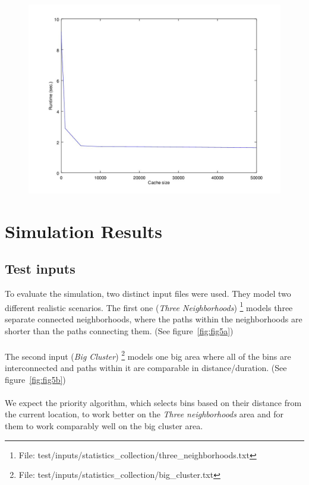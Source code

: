 \documentclass{article}
\begin{document}
			\begin{figure}[H]
			\centering
				\includegraphics[width=.55\columnwidth]{resources/cache_size.jpg}
				\label{fig:fig4}
			\end{figure}
			

	\section{Simulation Results} \label{stats}

		\subsection{Test inputs}
			To evaluate the simulation, two distinct input files were used. They model two different realistic scenarios.
			The first one (\textit{Three Neighborhoods}) \footnote{File: test/inputs/statistics\_collection/three\_neighborhoods.txt} models three separate connected neighborhoods, where the paths
			within the neighborhoods are shorter than the paths connecting them. (See figure~\ref{fig:fig5a}) 
			\\
			\\
			The second input (\textit{Big Cluster}) \footnote{File: test/inputs/statistics\_collection/big\_cluster.txt} models one big area where all of the bins are interconnected and paths
			within it are comparable in distance/duration. (See figure~\ref{fig:fig5b})
			\\
			\\
			We expect the priority algorithm, which selects bins based on their distance from the current location, to work
			better on the \textit{Three neighborhoods} area and for them to work comparably well on the big cluster area.
\end{document}
